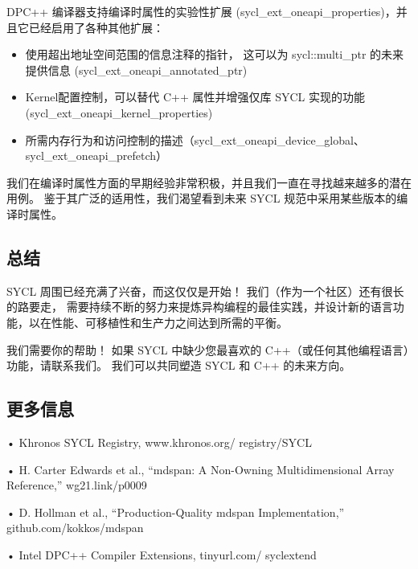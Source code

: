 DPC++ 编译器支持编译时属性的实验性扩展 (sycl\_ext\_oneapi\_properties)，并且它已经启用了各种其他扩展：

\begin{itemize}
	\item 使用超出地址空间范围的信息注释的指针，
	这可以为 sycl::multi\_ptr 的未来提供信息 (sycl\_ext\_oneapi\_annotated\_ptr)

	\item Kernel配置控制，可以替代 C++ 属性并增强仅库 SYCL 实现的功能 (sycl\_ext\_oneapi\_kernel\_properties)

	\item 所需内存行为和访问控制的描述（sycl\_ext\_oneapi\_device\_global、sycl\_ext\_oneapi\_prefetch）
\end{itemize}

我们在编译时属性方面的早期经验非常积极，并且我们一直在寻找越来越多的潜在用例。 
鉴于其广泛的适用性，我们渴望看到未来 SYCL 规范中采用某些版本的编译时属性。

\subsection{总结}
SYCL 周围已经充满了兴奋，而这仅仅是开始！ 我们（作为一个社区）还有很长的路要走，
需要持续不断的努力来提炼异构编程的最佳实践，并设计新的语言功能，以在性能、可移植性和生产力之间达到所需的平衡。

我们需要你的帮助！ 如果 SYCL 中缺少您最喜欢的 C++（或任何其他编程语言）功能，请联系我们。 
我们可以共同塑造 SYCL 和 C++ 的未来方向。

\subsection{更多信息}
• Khronos SYCL Registry, www.khronos.org/ registry/SYCL

• H. Carter Edwards et al., “mdspan: A Non-Owning Multidimensional Array Reference,” wg21.link/p0009

• D. Hollman et al., “Production-Quality mdspan Implementation,” github.com/kokkos/mdspan

• Intel DPC++ Compiler Extensions, tinyurl.com/ syclextend